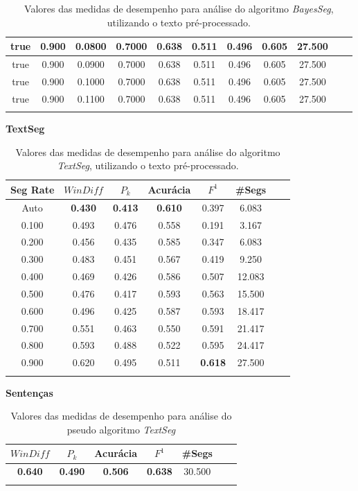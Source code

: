 \begin{longtable}[c]{|c|c|c|c|c|c|c|c|c|c|c|}
 true & 0.900 & 0.0800 & 0.7000 & 0.638 & 0.511 & 0.496 & 0.605 & 27.500  \\ \hline 
 true & 0.900 & 0.0900 & 0.7000 & 0.638 & 0.511 & 0.496 & 0.605 & 27.500  \\ \hline 
 true & 0.900 & 0.1000 & 0.7000 & 0.638 & 0.511 & 0.496 & 0.605 & 27.500  \\ \hline 
 true & 0.900 & 0.1100 & 0.7000 & 0.638 & 0.511 & 0.496 & 0.605 & 27.500  \\ \hline 
 \caption{Valores das medidas de desempenho para análise do algoritmo \textit{BayesSeg}, utilizando o texto pré-processado.}
 \end{longtable} 



\center
\textbf{TextSeg}  
\begin{longtable}[c]{|c|c|c|c|c|c|c|c|} 
\hline 
 Seg Rate & $WinDiff$ & $P_k$ & Acurácia & $F^1$ & \#Segs\\ \hline 
 Auto & \cellcolor{gray!20} \textbf{0.430} & \cellcolor{gray!20} \textbf{0.413} & \cellcolor{gray!20} \textbf{0.610} & 0.397 & 6.083  \\ \hline 
 0.100 & 0.493 & 0.476 & 0.558 & 0.191 & 3.167  \\ \hline 
 0.200 & 0.456 & 0.435 & 0.585 & 0.347 & 6.083  \\ \hline 
 0.300 & 0.483 & 0.451 & 0.567 & 0.419 & 9.250  \\ \hline 
 0.400 & 0.469 & 0.426 & 0.586 & 0.507 & 12.083  \\ \hline 
 0.500 & 0.476 & 0.417 & 0.593 & 0.563 & 15.500  \\ \hline 
 0.600 & 0.496 & 0.425 & 0.587 & 0.593 & 18.417  \\ \hline 
 0.700 & 0.551 & 0.463 & 0.550 & 0.591 & 21.417  \\ \hline 
 0.800 & 0.593 & 0.488 & 0.522 & 0.595 & 24.417  \\ \hline 
 0.900 & 0.620 & 0.495 & 0.511 & \cellcolor{gray!20} \textbf{0.618} & 27.500  \\ \hline 
 \caption{Valores das medidas de desempenho para análise do algoritmo \textit{TextSeg}, utilizando o texto pré-processado.}
 \end{longtable} 







\center
\textbf{Sentenças}  
\begin{longtable}[c]{|c|c|c|c|c|c|c|} 
\hline 
 $WinDiff$ & $P_k$ & Acurácia & $F^1$ & \#Segs\\ \hline 
 \cellcolor{gray!20} \textbf{0.640} & \cellcolor{gray!20} \textbf{0.490} & \cellcolor{gray!20} \textbf{0.506} & \cellcolor{gray!20} \textbf{0.638} & 30.500  \\ \hline 
 \caption{blalalalala}
 \caption{Valores das medidas de desempenho para análise do pseudo algoritmo \textit{TextSeg}}
\end{longtable} 

 
